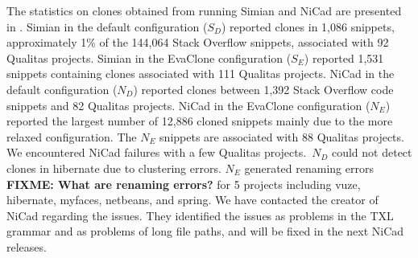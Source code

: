 \documentclass[sigconf,review, anonymous]{acmart}
\newcommand\FIXME[1]{\textbf{FIXME: #1}}
\begin{document}

The statistics on clones obtained from running Simian and NiCad are
presented in . Simian in the default configuration
($S_D$) reported clones in 1,086 snippets, approximately 1\% of the
144,064 Stack Overflow snippets, associated with 92 Qualitas
projects. Simian in the EvaClone configuration ($S_E$) reported 1,531
snippets containing clones associated with 111 Qualitas
projects. NiCad in the default configuration ($N_D$) reported clones
between 1,392 Stack Overflow code snippets and 82 Qualitas
projects. NiCad in the EvaClone configuration ($N_E$) reported the
largest number of 12,886 cloned snippets mainly due to the more
relaxed configuration. The $N_E$ snippets are associated with 88
Qualitas projects. We encountered NiCad failures with a few Qualitas
projects.~$N_D$ could not detect clones in \textsf{hibernate} due to
clustering errors. $N_E$ generated renaming errors \FIXME{What are
  renaming errors?}  for 5 projects including \textsf{vuze},
\textsf{hibernate}, \textsf{myfaces}, \textsf{netbeans}, and
\textsf{spring}. We have contacted the creator of NiCad regarding the
issues. They identified the issues as problems in the TXL grammar and
as problems of long file paths, and will be fixed in the next NiCad
releases. 
\end{document}
